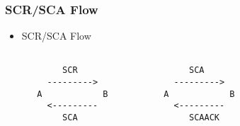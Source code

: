 \documentclass{beamer}
\begin{document}
\begin{frame}[fragile]
\frametitle{SCR/SCA Flow}
\begin{itemize}

\item { SCR/SCA Flow}
\begin{center}
\begin{BVerbatim}[fontfamily=courier, fontsize=\relsize{-3}, frame=single, rulecolor=\color{red}]

        SCR                      SCA
     --------->               ---------> 
   A            B           A            B 
     <---------               <---------
        SCA                      SCAACK    

\end{BVerbatim}
\end{center}


\end{itemize}
\end{frame}

\end{document}
